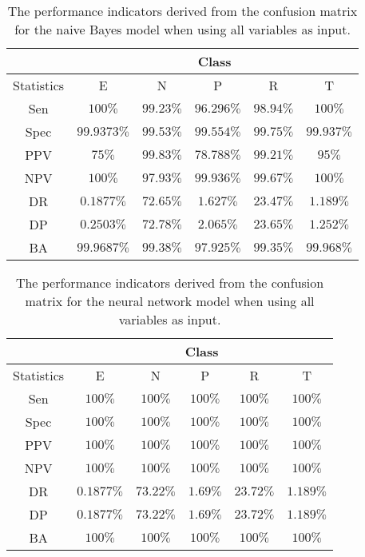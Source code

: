 \begin{table}[!ht]
	\centering
	\begin{tabular}{|c|c|c|c|c|c|}
		\hline
		 & \multicolumn{5}{c|}{Class} \\ \hline
		Statistics & E & N & P & R & T \\ \hline
		Sen & $100\%$ & $99.23\%$ & $96.296\%$ & $98.94\%$ & $100\%$ \\ \hline
		Spec & $99.9373\%$ & $99.53\%$ & $99.554\%$ & $99.75\%$ & $99.937\%$ \\ \hline
		PPV & $75\%$ & $99.83\%$ & $78.788\%$ & $99.21\%$ & $95\%$ \\ \hline
		NPV & $100\%$ & $97.93\%$ & $99.936\%$ & $99.67\%$ & $100\%$ \\ \hline
		DR & $0.1877\%$ & $72.65\%$ & $1.627\%$ & $23.47\%$ & $1.189\%$ \\ \hline
		DP & $0.2503\%$ & $72.78\%$ & $2.065\%$ & $23.65\%$ & $1.252\%$ \\ \hline
		BA & $99.9687\%$ & $99.38\%$ & $97.925\%$ & $99.35\%$ & $99.968\%$ \\ \hline
	\end{tabular}
	\caption{The performance indicators derived from the confusion matrix for the naive Bayes model when using all variables as input.}
	\label{tab:cs:reverse:all:nb}
\end{table}

\begin{table}[!ht]
	\centering
	\begin{tabular}{|c|c|c|c|c|c|}
		\hline
		 & \multicolumn{5}{c|}{Class} \\ \hline
		Statistics & E & N & P & R & T \\ \hline
		Sen & $100\%$ & $100\%$ & $100\%$ & $100\%$ & $100\%$ \\ \hline
		Spec & $100\%$ & $100\%$ & $100\%$ & $100\%$ & $100\%$ \\ \hline
		PPV & $100\%$ & $100\%$ & $100\%$ & $100\%$ & $100\%$ \\ \hline
		NPV & $100\%$ & $100\%$ & $100\%$ & $100\%$ & $100\%$ \\ \hline
		DR & $0.1877\%$ & $73.22\%$ & $1.69\%$ & $23.72\%$ & $1.189\%$ \\ \hline
		DP & $0.1877\%$ & $73.22\%$ & $1.69\%$ & $23.72\%$ & $1.189\%$ \\ \hline
		BA & $100\%$ & $100\%$ & $100\%$ & $100\%$ & $100\%$ \\ \hline
	\end{tabular}
	\caption{The performance indicators derived from the confusion matrix for the neural network model when using all variables as input.}
	\label{tab:cs:reverse:all:nnet}
\end{table}

